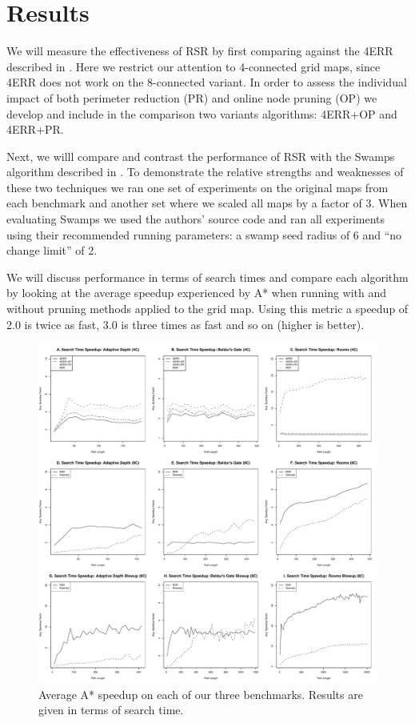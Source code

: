 \section{Results}
\label{sec-results}
We will measure the effectiveness of RSR by first comparing against the 4ERR
described in \cite{harabor10}.  Here we restrict our attention to 4-connected
grid maps, since 4ERR does not work on the 8-connected variant.  In order to
assess the individual impact of both perimeter reduction (PR) and online node
pruning (OP) we develop and include in the comparison two variants algorithms:
4ERR+OP and 4ERR+PR.  
\par
Next, we willl compare and contrast the performance of RSR
with the Swamps algorithm described in \cite{pochter10}.  To demonstrate the
relative strengths and weaknesses of these two techniques we ran one set of
experiments on the original maps from each benchmark and another set where we
scaled all maps by a factor of 3.  When evaluating Swamps we used the authors'
source code and ran all experiments using their recommended running parameters:
a swamp seed radius of 6 and ``no change limit'' of 2.  
\par 
We will discuss performance in terms of search times and compare each algorithm
by looking at the average speedup experienced by A* when running with and
without pruning methods applied to the grid map.  Using this metric a speedup of
2.0 is twice as fast, 3.0 is three times as fast and so on (higher is better).

\begin{figure}[t]
       \begin{center}
                       \includegraphics[width=1.95\columnwidth, trim = 10mm 10mm 10mm 0mm]{diagrams/speedup.pdf}
       \end{center}
       \caption{Average A* speedup on each of our three benchmarks. 
		Results are given in terms of search time.}
\label{fig-speedup}
\end{figure}

